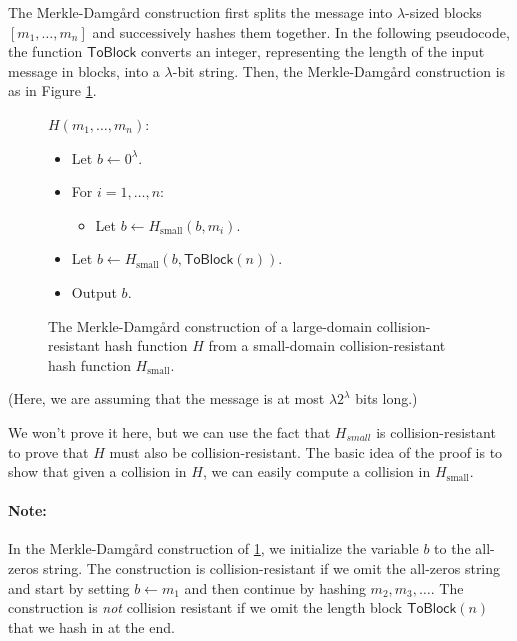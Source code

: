 The Merkle-Damg\aa{}rd construction first splits the
message into $\lambda$-sized blocks $[m_1, \ldots, m_n]$ and successively hashes them together.
In the following pseudocode,
the function $\mathsf{ToBlock}$ converts an integer, representing the length of the input message
in blocks, into a $\lambda$-bit string.
Then, the Merkle-Damg\aa{}rd construction is as in Figure \ref{fig:md}.
\begin{figure}
\begin{framed}
\noindent
  $H(m_1, \dots, m_n)$: \qquad {}
\begin{itemize}[noitemsep]
  \item Let $b \gets 0^\lambda$.
  \item For $i = 1, \dots, n$:
   \begin{itemize}
     \item Let $b \gets H_\text{small}(b, m_i)$.
   \end{itemize}
 \item Let $b \gets H_\text{small}(b, \mathsf{ToBlock}(n))$.
 \item Output $b$.
\end{itemize}
\end{framed}
\caption{The Merkle-Damg\aa{}rd construction of a large-domain
collision-resistant hash function $H$ from a small-domain
collision-resistant hash function $H_\text{small}$.}
  \label{fig:md}
\end{figure}
(Here, we are assuming that the message is at most 
$\lambda 2^{\lambda}$ bits long.)

We won't prove it here, but we can use the fact that $H_{small}$ is collision-resistant to prove that $H$ must also be collision-resistant. The basic idea of the proof is to show that given a collision in $H$, we can easily compute a collision in $H_{\text{small}}$. 

\paragraph{Note:} In 
the Merkle-Damg\aa{}rd construction of \cref{fig:md},
we initialize the variable $b$ to the all-zeros string.
The construction is collision-resistant if we omit the all-zeros
string and start by setting $b \gets m_1$ and then continue by hashing $m_2, m_3, \dots$.
The construction is \emph{not} collision resistant if we omit the length block
$\mathsf{ToBlock}(n)$ that we hash in at the end.

